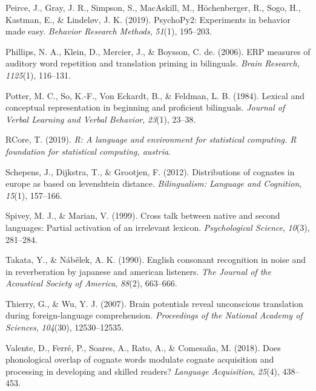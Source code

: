 \documentclass[
]{article}
\newlength{\cslhangindent}
\newenvironment{CSLReferences}[2] %
 {\begin{list}{}{%
  \setlength{\itemindent}{0pt}
  \setlength{\leftmargin}{0pt}
  \setlength{\parsep}{0pt}
  \ifodd #1
   \setlength{\leftmargin}{\cslhangindent}
   \setlength{\itemindent}{-1\cslhangindent}
  \fi
  \setlength{\itemsep}{#2\baselineskip}}}
 {\end{list}}
\begin{document}
\begin{CSLReferences}{1}{0}
Peirce, J., Gray, J. R., Simpson, S., MacAskill, M., Höchenberger, R.,
Sogo, H., Kastman, E., \& Lindeløv, J. K. (2019). PsychoPy2: Experiments
in behavior made easy. \emph{Behavior Research Methods}, \emph{51}(1),
195--203.

Phillips, N. A., Klein, D., Mercier, J., \& Boysson, C. de. (2006). ERP
measures of auditory word repetition and translation priming in
bilinguals. \emph{Brain Research}, \emph{1125}(1), 116--131.

Potter, M. C., So, K.-F., Von Eckardt, B., \& Feldman, L. B. (1984).
Lexical and conceptual representation in beginning and proficient
bilinguals. \emph{Journal of Verbal Learning and Verbal Behavior},
\emph{23}(1), 23--38.

RCore, T. (2019). \emph{R: A language and environment for statistical
computing. R foundation for statistical computing, austria}.

Schepens, J., Dijkstra, T., \& Grootjen, F. (2012). Distributions of
cognates in europe as based on levenshtein distance. \emph{Bilingualism:
Language and Cognition}, \emph{15}(1), 157--166.

Spivey, M. J., \& Marian, V. (1999). Cross talk between native and
second languages: Partial activation of an irrelevant lexicon.
\emph{Psychological Science}, \emph{10}(3), 281--284.

Takata, Y., \& Nábělek, A. K. (1990). English consonant recognition in
noise and in reverberation by japanese and american listeners. \emph{The
Journal of the Acoustical Society of America}, \emph{88}(2), 663--666.

Thierry, G., \& Wu, Y. J. (2007). Brain potentials reveal unconscious
translation during foreign-language comprehension. \emph{Proceedings of
the National Academy of Sciences}, \emph{104}(30), 12530--12535.

Valente, D., Ferré, P., Soares, A., Rato, A., \& Comesaña, M. (2018).
Does phonological overlap of cognate words modulate cognate acquisition
and processing in developing and skilled readers? \emph{Language
Acquisition}, \emph{25}(4), 438--453.


\end{CSLReferences}
\end{document}
